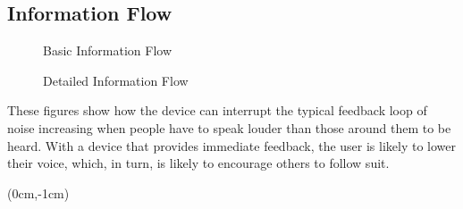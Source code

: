 \newpage
\subsection{Information Flow}
\vspace{-0.5cm}
\begin{figure}[h]
    \centering
    \caption{Basic Information Flow}
    \vspace{0.2cm}
    \caption{Detailed Information Flow}
\end{figure}
\vspace{-0.25cm}
\noindent
These figures show how the device can interrupt the typical feedback loop of noise increasing when people have to speak louder than those around them to be heard. With a device that provides immediate feedback, the user is likely to lower their voice, which, in turn, is likely to encourage others to follow suit.

\begin{textblock*}{3cm}(0cm,-1cm) %
\end{textblock*}


